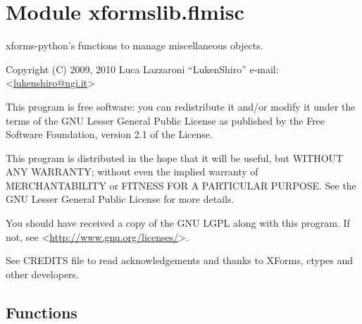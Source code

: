 %
%
%


\section{Module xformslib.flmisc}

    \label{xformslib:flmisc}

xforms-python's functions to manage miscellaneous objects.

Copyright (C) 2009, 2010  Luca Lazzaroni ``LukenShiro''
e-mail: <\href{mailto:lukenshiro@ngi.it}{lukenshiro@ngi.it}>

This program is free software: you can redistribute it and/or modify
it under the terms of the GNU Lesser General Public License as
published by the Free Software Foundation, version 2.1 of the License.

This program is distributed in the hope that it will be useful,
but WITHOUT ANY WARRANTY; without even the implied warranty of
MERCHANTABILITY or FITNESS FOR A PARTICULAR PURPOSE. See the
GNU Lesser General Public License for more details.

You should have received a copy of the GNU LGPL along with this
program. If not, see <\href{http://www.gnu.org/licenses/}{http://www.gnu.org/licenses/}>.

See CREDITS file to read acknowledgements and thanks to XForms,
ctypes and other developers.


  \subsection{Functions}

    \label{xformslib:flmisc:fl_add_box}

